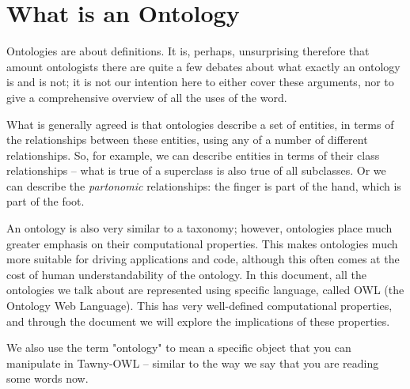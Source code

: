 \section{What is an Ontology}
\label{sec-2}
\label{what_is_an_ontology}

Ontologies are about definitions. It is, perhaps, unsurprising therefore
that amount ontologists there are quite a few debates about what exactly
an ontology is and is not; it is not our intention here to either cover
these arguments, nor to give a comprehensive overview of all the uses of
the word.

What is generally agreed is that ontologies describe a set of entities,
in terms of the relationships between these entities, using any of a
number of different relationships. So, for example, we can describe
entities in terms of their class relationships -- what is true of a
superclass is also true of all subclasses. Or we can describe the
\emph{partonomic} relationships: the finger is part of the hand, which is
part of the foot.

An ontology is also very similar to a taxonomy; however, ontologies
place much greater emphasis on their computational properties. This
makes ontologies much more suitable for driving applications and code,
although this often comes at the cost of human understandability of the
ontology. In this document, all the ontologies we talk about are
represented using specific language, called OWL (the Ontology Web
Language). This has very well-defined computational properties, and
through the document we will explore the implications of these
properties.

We also use the term "ontology" to mean a specific object that you can
manipulate in Tawny-OWL -- similar to the way we say that you are
reading some words now.

